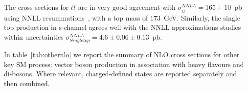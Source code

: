 The cross sections for $t\bar{t}$ are in very good agreement with 
$\sigma^{NNLL}_{t\bar{t}} = 165 \pm 10$~pb using NNLL 
resummations~\cite{nnllttbar}, with a top mass of $173$~GeV. Similarly, the 
single top production in s-channel agrees well with the NNLL approximations 
studies~\cite{nnllschannel} within uncertainties 
$\sigma^{NNLL}_{Single top} = 4.6 \pm 0.06 \pm 0.13$~pb. 

In table~\ref{tab:othernlo} we report the summary of NLO cross sections for other key 
SM process: vector boson production in association with heavy flavours and di-bosons.
Where relevant, charged-defined states are reported separately and then combined. \\

\begin{table}[htb]
  \begin{center}
    \begin{tabular}{|l|c|c|c|c|}
      \hline
      

\end{tabular}
\end{center}
\end{table}
